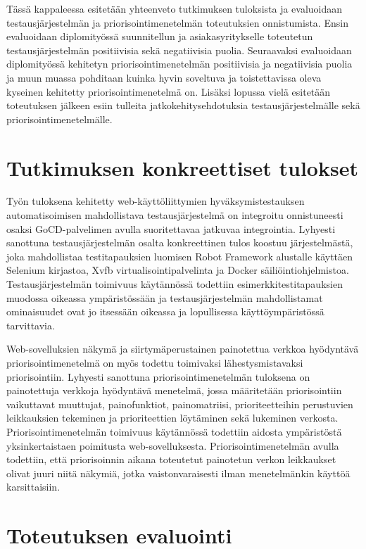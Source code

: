 Tässä kappaleessa esitetään yhteenveto tutkimuksen tuloksista ja evaluoidaan testausjärjestelmän ja priorisointimenetelmän toteutuksien onnistumista.
Ensin evaluoidaan diplomityössä suunnitellun ja asiakasyritykselle toteutetun testausjärjestelmän positiivisia sekä negatiivisia puolia.
Seuraavaksi evaluoidaan diplomityössä kehitetyn priorisointimenetelmän positiivisia ja negatiivisia puolia ja muun muassa pohditaan kuinka hyvin soveltuva ja toistettavissa oleva kyseinen kehitetty priorisointimenetelmä on.
Lisäksi lopussa vielä esitetään toteutuksen jälkeen esiin tulleita jatkokehitysehdotuksia testausjärjestelmälle sekä priorisointimenetelmälle.

\section{Tutkimuksen konkreettiset tulokset} \label{ch:12_tutkimuksen_konkreettiset_tulokset}

  Työn tuloksena kehitetty  web-käyttöliittymien hyväksymistestauksen automatisoimisen mahdollistava testausjärjestelmä on integroitu onnistuneesti osaksi GoCD-palvelimen avulla suoritettavaa jatkuvaa integrointia.
  Lyhyesti sanottuna testausjärjestelmän osalta konkreettinen tulos koostuu järjestelmästä, joka mahdollistaa testitapauksien luomisen Robot Framework alustalle käyttäen Selenium kirjastoa, Xvfb virtualisointipalvelinta ja Docker säiliöintiohjelmistoa.
  Testausjärjestelmän toimivuus käytännössä todettiin esimerkkitestitapauksien muodossa oikeassa ympäristössään ja testausjärjestelmän mahdollistamat ominaisuudet ovat jo itsessään oikeassa ja lopullisessa käyttöympäristössä tarvittavia.

  Web-sovelluksien näkymä ja siirtymäperustainen painotettua verkkoa hyödyntävä priorisointimenetelmä on myös todettu toimivaksi lähestysmistavaksi priorisointiin.
  Lyhyesti sanottuna priorisointimenetelmän tuloksena on painotettuja verkkoja hyödyntävä menetelmä, jossa määritetään priorisointiin vaikuttavat muuttujat, painofunktiot, painomatriisi, prioriteetteihin perustuvien leikkauksien tekeminen ja prioriteettien löytäminen sekä lukeminen verkosta.
  Priorisointimenetelmän toimivuus käytännössä todettiin aidosta ympäristöstä yksinkertaistaen poimitusta web-sovelluksesta.
  Priorisointimenetelmän avulla todettiin, että priorisoinnin aikana toteutetut painotetun verkon leikkaukset olivat juuri niitä näkymiä, jotka vaistonvaraisesti ilman menetelmänkin käyttöä karsittaisiin.

\section{Toteutuksen evaluointi} \label{ch:12_toteutuksen_evaluointi}

